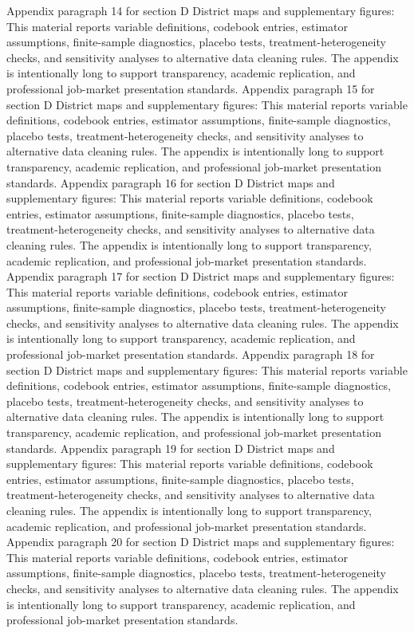\documentclass[preprint,12pt]{elsarticle}
\begin{document}
Appendix paragraph 14 for section D District maps and supplementary figures: This material reports variable definitions, codebook entries, estimator assumptions, finite-sample diagnostics, placebo tests, treatment-heterogeneity checks, and sensitivity analyses to alternative data cleaning rules. The appendix is intentionally long to support transparency, academic replication, and professional job-market presentation standards.
Appendix paragraph 15 for section D District maps and supplementary figures: This material reports variable definitions, codebook entries, estimator assumptions, finite-sample diagnostics, placebo tests, treatment-heterogeneity checks, and sensitivity analyses to alternative data cleaning rules. The appendix is intentionally long to support transparency, academic replication, and professional job-market presentation standards.
Appendix paragraph 16 for section D District maps and supplementary figures: This material reports variable definitions, codebook entries, estimator assumptions, finite-sample diagnostics, placebo tests, treatment-heterogeneity checks, and sensitivity analyses to alternative data cleaning rules. The appendix is intentionally long to support transparency, academic replication, and professional job-market presentation standards.
Appendix paragraph 17 for section D District maps and supplementary figures: This material reports variable definitions, codebook entries, estimator assumptions, finite-sample diagnostics, placebo tests, treatment-heterogeneity checks, and sensitivity analyses to alternative data cleaning rules. The appendix is intentionally long to support transparency, academic replication, and professional job-market presentation standards.
Appendix paragraph 18 for section D District maps and supplementary figures: This material reports variable definitions, codebook entries, estimator assumptions, finite-sample diagnostics, placebo tests, treatment-heterogeneity checks, and sensitivity analyses to alternative data cleaning rules. The appendix is intentionally long to support transparency, academic replication, and professional job-market presentation standards.
Appendix paragraph 19 for section D District maps and supplementary figures: This material reports variable definitions, codebook entries, estimator assumptions, finite-sample diagnostics, placebo tests, treatment-heterogeneity checks, and sensitivity analyses to alternative data cleaning rules. The appendix is intentionally long to support transparency, academic replication, and professional job-market presentation standards.
Appendix paragraph 20 for section D District maps and supplementary figures: This material reports variable definitions, codebook entries, estimator assumptions, finite-sample diagnostics, placebo tests, treatment-heterogeneity checks, and sensitivity analyses to alternative data cleaning rules. The appendix is intentionally long to support transparency, academic replication, and professional job-market presentation standards.
\end{document}
